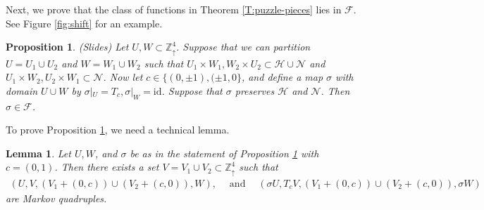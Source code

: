 \documentclass[aop, preprint]{imsart}
\theoremstyle{plain}
\newtheorem{prop}[theorem]{Proposition}%
\newtheorem{lemma}[theorem]{Lemma}
\theoremstyle{definition}
\theoremstyle{plain}
\newcommand{\sset}{\subset}
\newcommand{\mathand}{\;\text{and}\;}
\newcommand{\sig}{\sigma}
\newcommand{\Zd}{\mathds{Z}^4_\uparrow}
\newcommand{\scrH}{\mathcal{H}}
\newcommand{\scrN}{\mathcal{N}}
\newcommand{\scrF}{\mathcal{F}}
\newcommand{\X}{\times}
\newcommand{\id}{\text{id}}
\begin{document}
Next, we prove that the class of functions in Theorem \ref{T:puzzle-pieces} lies in $\scrF$. See Figure \ref{fig:shift} for an example.

\begin{prop}
	\label{P:slides} (Slides)
	Let $U, W \sset \Zd$. Suppose that we can partition $U = U_1 \cup U_2$ and $W = W_1 \cup W_2$ such that $U_1 \X W_1, W_2 \X U_2 \sset \scrH \cup \scrN$ and $U_1 \X W_2, U_2 \X W_1 \sset \scrN$. Now let $c \in \{(0, \pm 1), (\pm 1, 0\}$, and define a map $\sig$ with domain $U \cup W$ by  $\sig|_U = T_c, \sig|_W = \id$. Suppose that $\sig$ preserves $\scrH$ and $\scrN$. Then $\sig \in \scrF$.
\end{prop}

To prove Proposition \ref{P:slides}, we need a technical lemma.


\begin{lemma}
	\label{L:shift-part-ii}
	Let $U, W$, and $\sig$ be as in the statement of Proposition \ref{P:slides} with $c = (0, 1)$.
	Then there exists a set $V = V_1 \cup V_2 \sset \Zd$ such that 
	\begin{align*}
	(U, V, (V_1 + (0, c)) \cup (V_2 + (c, 0)), W), \quad \mathand \quad (\sig U, T_c V, (V_1 + (0, c)) \cup (V_2 + (c, 0)), \sig W)
	\end{align*}
	are Markov quadruples.
\end{lemma}
\end{document}
